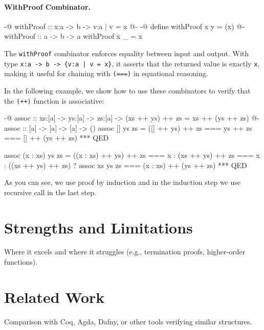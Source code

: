 \paragraph{WithProof Combinator.}
\begin{code}[label={lst:proof-withproof}]
	{-@ withProof :: x:a -> b -> {v:a | v = x} @-}
	{-@ define withProof x y = (x) @-}
	withProof :: a -> b -> a
	withProof x _ = x
\end{code}
The \texttt{withProof} combinator enforces equality between input and output.
With type \texttt{x:a -> b -> \{v:a | v = x\}}, it asserts that the returned value is exactly \texttt{x}, making it useful for chaining with \texttt{(===)} in equational reasoning.

In the following example, we show how to use these combinators to verify that the \texttt{(++)} function is associative:


\begin{code}[ label={lst:associative}]
	{-@ assoc :: xs:[a] -> ys:[a] -> zs:[a]
	-> { (xs ++ ys) ++ zs = xs ++ (ys ++ zs) } @-}
	assoc :: [a] -> [a] -> [a] -> ()
	assoc [] ys zs = ([] ++ ys) ++ zs
	=== ys ++ zs
	=== [] ++ (ys ++ zs)
	*** QED

	assoc (x : xs) ys zs = ((x : xs) ++ ys) ++ zs
	===  x : (xs ++ ys) ++ zs
	=== x : ((xs ++ ys) ++ zs) ? assoc xs ys zs
	=== (x : xs) ++ (ys ++ zs)
	*** QED
\end{code}
\vspace{1em}

As you can see, we use proof by induction and in the induction step we use recursive call in the last step.
\section { Strengths and Limitations }
Where it excels and where it struggles (e.g., termination proofs, higher-order functions).
\section { Related Work }
Comparison with Coq, Agda, Dafny, or other tools verifying similar structures.
